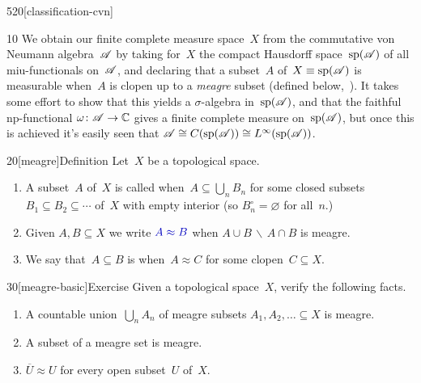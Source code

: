 \begin{parsec}{520}[classification-cvn]
\begin{point}{10}
We obtain our finite complete measure space~$X$
from the commutative von Neumann algebra~$\mathscr{A}$
by taking for~$X$ the compact Hausdorff space~$\mathrm{sp}(\mathscr{A})$
of all miu-functionals on~$\mathscr{A}$,
and declaring that a subset~$A$ of~$X\equiv \mathrm{sp}(\mathscr{A})$ 
is measurable when~$A$ is clopen up to
a \emph{meagre}
subset
(defined below,~).
It takes some effort to show
that this yields a $\sigma$-algebra
in~$\mathrm{sp}(\mathscr{A})$,
and that the faithful np-functional $\omega\colon\mathscr{A}\to \mathbb{C}$
gives a finite complete measure on~$\mathrm{sp}(\mathscr{A})$,
but once this is achieved
it's easily seen that
$\mathscr{A}\cong C(\mathrm{sp}(\mathscr{A}))\cong L^\infty(\mathrm{sp}(\mathscr{A}))$.
\end{point}
\begin{point}{20}[meagre]{Definition}%
Let~$X$ be a topological space.
\begin{enumerate}
\item
A subset~$A$ of~$X$
is called %
when~$A\subseteq \bigcup_n B_n$
for some closed subsets $B_1\subseteq B_2\subseteq \dotsb$
of~$X$ with empty interior (so  $B_n^\circ=\varnothing$
for all~$n$.)
\item
Given $A,B\subseteq X$ 
we write $\Define{A\approx B}$
 when
$A\cup B\,\backslash\,A\cap B$
is meagre.
\item
We say that~$A\subseteq B$
is %
when~$A\approx C$
for some clopen~$C\subseteq X$.
\end{enumerate}
\end{point}
\begin{point}{30}[meagre-basic]{Exercise}%
Given a topological space~$X$,
verify the following facts.
\begin{enumerate}
\item
A countable union~$\bigcup_n A_n$
of meagre subsets $A_1,A_2,\dotsc\subseteq X $ is meagre.
\item
A subset of a meagre set is meagre.
\item
$\overline{U}\approx U$
for every open subset~$U$ of~$X$.


\end{enumerate}
\end{point}
\end{parsec}
